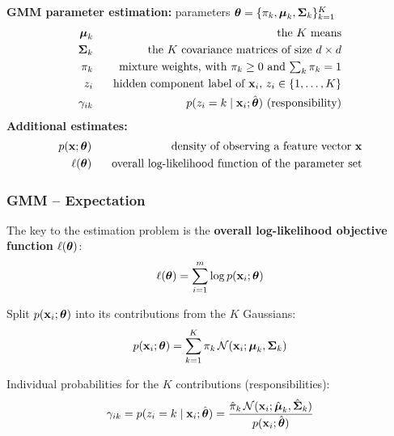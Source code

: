  \textbf{GMM parameter estimation:} parameters $\bm{\mathrm{\theta}}=\{\pi_k,\bm{\mathrm{\mu}}_k,\mathbf{\Sigma}_k\}_{k=1}^K$
%  
  \begin{eqnarray*}
    \bm{\mathrm{\mu}}_k    &\phantom{=}& \mbox{the $K$ means} \\
    \mathbf{\Sigma}_k &\phantom{=}& \mbox{the $K$ covariance matrices of size $d \times d$} \\
    \pi_k          &\phantom{=}& \mbox{mixture weights, with $\pi_k\ge 0$ and $\sum_k \pi_k=1$} \\
    z_i          &\phantom{=}& \mbox{hidden component label of $\bm{\mathrm{x}}_i$, $z_i\in\{1,\dots,K\}$}\\
    \gamma_{ik}       &\phantom{=}& p(z_i=k\mid \bm{\mathrm{x}}_i;\hat{\bm{\mathrm{\theta}}})\ \mbox{(responsibility)}
  \end{eqnarray*}
    \textbf{Additional estimates:}
%  
  \begin{eqnarray*}
    p(\bm{\mathrm{x}};\bm{\mathrm{\theta}}) &\phantom{=}& \mbox{density of observing a feature vector $\bm{\mathrm{x}}$} \\
    \ell(\bm{\mathrm{\theta}})         &\phantom{=}& \mbox{overall log-likelihood function of the parameter set}
  \end{eqnarray*}
     
  \subsubsection{GMM -- Expectation}
  
  The key to the estimation problem is the \textbf{overall log-likelihood objective function $\ell(\bm{\mathrm{\theta}})$}:
  \begin{displaymath}
    \ell(\bm{\mathrm{\theta}}) = \sum_{i = 1}^{m} \log p(\bm{\mathrm{x}}_i;\bm{\mathrm{\theta}})
  \end{displaymath}
  
  Split $p(\bm{\mathrm{x}}_i;\bm{\mathrm{\theta}})$ into its contributions from the $K$ Gaussians:
  \begin{displaymath}
    p(\bm{\mathrm{x}}_i;\bm{\mathrm{\theta}}) = \sum_{k=1}^{K} \pi_k \, {\mathcal N}(\bm{\mathrm{x}}_i; \bm{\mathrm{\mu}}_k, \mathbf{\Sigma}_k)
  \end{displaymath}

  Individual probabilities for the $K$ contributions (responsibilities):
  \begin{displaymath}
    \gamma_{ik} = p(z_i=k\mid\bm{\mathrm{x}}_i;\hat{\bm{\mathrm{\theta}}}) = \frac{ \hat\pi_k\,{\mathcal N}(\bm{\mathrm{x}}_i; \hat{\bm{\mathrm{\mu}}}_k, \hat{\mathbf{\Sigma}}_k)}{p(\bm{\mathrm{x}}_i;\hat{\bm{\mathrm{\theta}}})}
  \end{displaymath}
     
